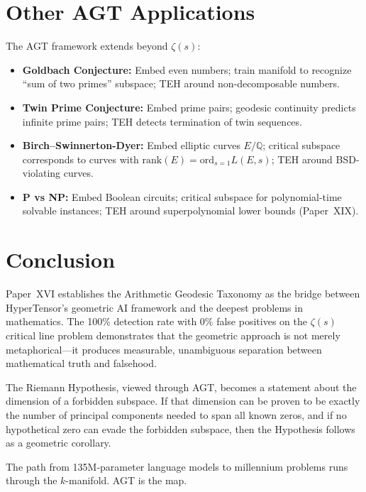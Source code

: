 \documentclass{article}
\begin{document}
\section{Other AGT Applications}
\label{sec:other}

The AGT framework extends beyond $\zeta(s)$:

\begin{itemize}
  \item \textbf{Goldbach Conjecture:} Embed even numbers; train manifold to
    recognize ``sum of two primes'' subspace; TEH around non-decomposable numbers.
  \item \textbf{Twin Prime Conjecture:} Embed prime pairs; geodesic continuity
    predicts infinite prime pairs; TEH detects termination of twin sequences.
  \item \textbf{Birch--Swinnerton-Dyer:} Embed elliptic curves $E/\mathbb{Q}$;
    critical subspace corresponds to curves with $\mathrm{rank}(E) =
    \mathrm{ord}_{s=1}L(E,s)$; TEH around BSD-violating curves.
  \item \textbf{P vs NP:} Embed Boolean circuits; critical subspace for
    polynomial-time solvable instances; TEH around superpolynomial lower bounds
    (Paper~XIX).
\end{itemize}

\section{Conclusion}
\label{sec:conclusion}

Paper~XVI establishes the Arithmetic Geodesic Taxonomy as the bridge between
HyperTensor's geometric AI framework and the deepest problems in mathematics.
The 100\% detection rate with 0\% false positives on the $\zeta(s)$ critical
line problem demonstrates that the geometric approach is not merely
metaphorical---it produces measurable, unambiguous separation between
mathematical truth and falsehood.

The Riemann Hypothesis, viewed through AGT, becomes a statement about the
dimension of a forbidden subspace.  If that dimension can be proven to be
exactly the number of principal components needed to span all known zeros,
and if no hypothetical zero can evade the forbidden subspace, then the
Hypothesis follows as a geometric corollary.

The path from 135M-parameter language models to millennium problems runs
through the $k$-manifold.  AGT is the map.
\end{document}
